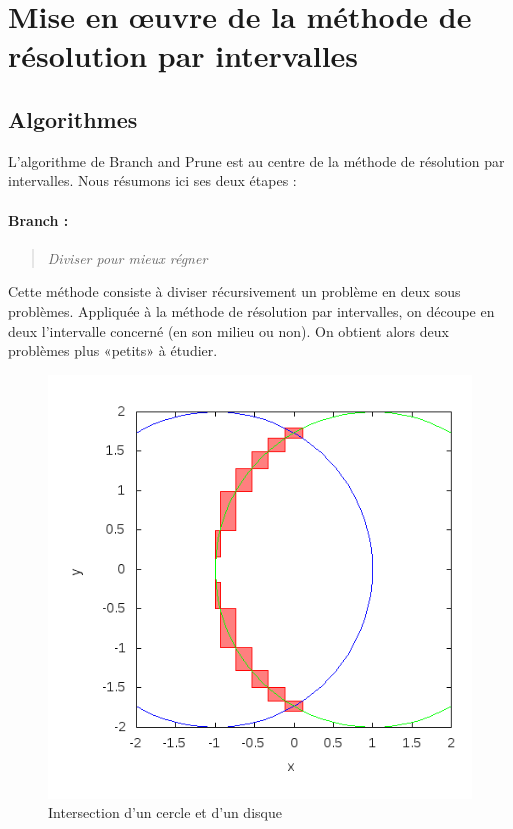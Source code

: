 \section{Mise en œuvre de la méthode de résolution par intervalles}



\subsection{Algorithmes}
L'algorithme de Branch and Prune  est au centre de la méthode de résolution par intervalles. Nous résumons ici ses deux étapes :  %
\paragraph{Branch :}
\begin{quote}\emph{Diviser pour mieux régner}\end{quote} Cette méthode consiste à diviser récursivement un problème en deux sous problèmes. Appliquée à la méthode de résolution par intervalles, on découpe en deux l'intervalle concerné (en son milieu ou non). On obtient alors deux problèmes plus «petits» à étudier.%
\begin{figure}[h!] %
  \center
\includegraphics[scale=0.5]{img/circle-disk}
  \caption{Intersection d'un cercle et d'un disque} %
 \label{fig:CercleDisque} %
\end{figure} %
